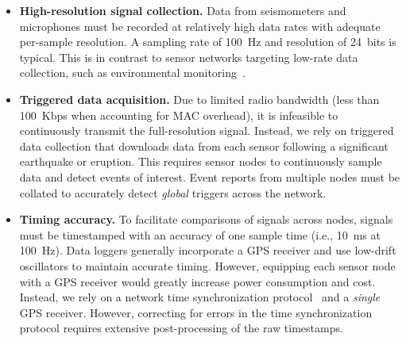 \begin{itemize}

\item \textbf{High-resolution signal collection.} Data from seismometers and
microphones must be recorded at relatively high data rates with adequate
per-sample resolution. A sampling rate of 100~Hz and resolution of 24~bits is
typical. This is in contrast to sensor networks targeting low-rate data
collection, such as environmental
monitoring~\cite{gdi-sensys04,berkeley-redwoods}.

\item \textbf{Triggered data acquisition.} Due to limited radio bandwidth
(less than 100~Kbps when accounting for MAC overhead), it is infeasible to
continuously transmit the full-resolution signal. Instead, we rely on
triggered data collection that downloads data from each sensor following a
significant earthquake or eruption. This requires sensor nodes to
continuously sample data and detect events of interest. Event reports from
multiple nodes must be collated to accurately detect \textit{global} triggers
across the network.

\item \textbf{Timing accuracy.} To facilitate comparisons of signals across
nodes, signals must be timestamped with an accuracy of one sample time (i.e.,
10~ms at 100~Hz). Data loggers generally incorporate a GPS receiver and use
low-drift oscillators to maintain accurate timing. However, equipping each
sensor node with a GPS receiver would greatly increase power consumption and
cost. Instead, we rely on a network time synchronization
protocol~\cite{rbs,ftsp} and a \textit{single} GPS receiver. However,
correcting for errors in the time synchronization protocol requires extensive
post-processing of the raw timestamps.

\end{itemize}
